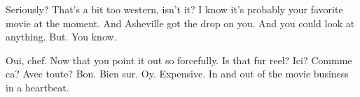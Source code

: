 

Seriously?  That's a bit too western, isn't it?  I know it's probably
your favorite movie at the moment.  And Asheville got the drop on you.
And you could look at anything.  But.  You know.

Oui, chef.  Now that you point it out so forcefully.  Is that fur
reel?  Ici?  Commme ca?  Avec toute?  Bon.  Bien sur.  Oy.  Expensive.  In and out of the movie business in a heartbeat.

\bye
